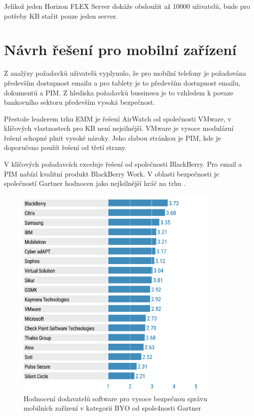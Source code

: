 Jelikož jeden Horizon FLEX Server dokáže obsloužit až 10000 uživatelů, bude pro potřeby KB stačit pouze jeden server. 



\section{Návrh řešení pro mobilní zařízení}

Z analýzy požadavků uživatelů vyplynulo, že pro mobilní telefony je požadována především dostupnost emailu a pro tablety je to především dostupnost emailu, dokumentů a PIM. Z hlediska požadavků bussinesu je to vzhledem k povaze bankovního sektoru především vysoká bezpečnost.

Přestože leaderem trhu EMM je řešení AirWatch od společnosti VMware, v klíčových vlastnostech pro KB není nejsilnější. VMware je vysoce modulární řešení schopné plnit vysoké nároky. Jeho slabou stránkou je PIM, kde je doporučeno použít řešení od třetí strany.

V klíčových požadavcích exceluje řešení od společnosti BlackBerry. Pro email a PIM nabízí kvalitní produkt BlackBerry Work. V oblasti bezpečnosti je společností Gartner hodnocen jako nejlsilnější hráč na trhu .

\begin{figure}[h!]\label{GartnerBB}
\centering
\includegraphics[width=10cm]{img/GartnerBB}
\caption{Hodnocení dodavatelů software pro vysoce bezpečnou správu mobilních zařízení v kategorii BYO od spole4nosti Gartner}
\end{figure} 

